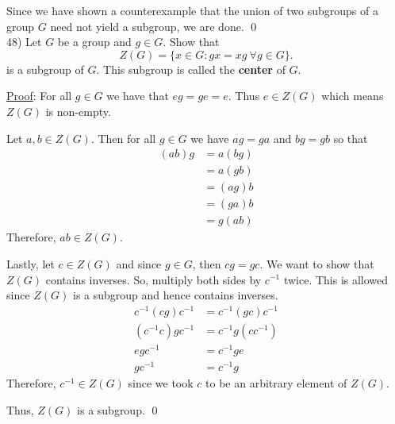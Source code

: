 \documentclass{article}
\begin{document}
Since we have shown a counterexample that the union of two subgroups of a group $G$ need not yield a subgroup, we are done. \qed \\


48) Let $G$ be a group and $g \in G.$ Show that 
	$$ Z(G) = \{x \in G : gx = xg \ \forall g \in G\}. $$
is a subgroup of $G$. This subgroup is called the \textbf{center} of $G$.

\underline{Proof}: For all $g \in G$ we have that $eg = ge = e.$ Thus $e \in Z(G)$ which means $Z(G)$ is non-empty.

Let $a, b \in Z(G).$ Then for all $g \in G$ we have $ag = ga$ and $bg = gb$ so that
\begin{align*}
	(ab)g &= a(bg) \\
	&= a(gb) \\
	&= (ag)b \\
	&= (ga)b \\
	&= g(ab)
\end{align*}
Therefore, $ab \in Z(G).$ 

Lastly, let $c\in Z(G)$ and since $g \in G$, then $cg = gc.$ We want to show that $Z(G)$ contains inverses. So, multiply both sides by $c^{-1}$ twice. This is allowed since $Z(G)$ is a subgroup and hence contains inverses. 
\begin{align*}
	c^{-1} (cg) c^{-1} &= c^{-1} (gc) c^{-1} \\
	(c^{-1} c) gc^{-1} &= c^{-1}g(cc^{-1}) \\
	egc^{-1} &= c^{-1}ge \\
	gc^{-1} &= c^{-1}g
\end{align*}
Therefore, $c^{-1} \in Z(G)$ since we took $c$ to be an arbitrary element of $Z(G).$ 

Thus, $Z(G)$ is a subgroup. \qed \\
\end{document}
